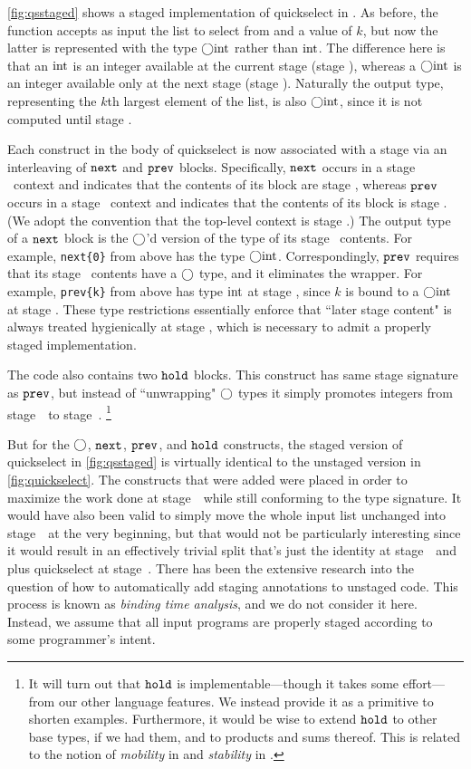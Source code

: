 \ref{fig:qsstaged} shows a staged implementation of quickselect in \lang.
As before, the function accepts as input the list to select from and a value of $k$,
but now the latter is represented with the type $\bigcirc{\rm int}$ rather than ${\rm int}$.
The difference here is that an ${\rm int}$ is an integer available at the current stage (stage \bbone), 
whereas a $\bigcirc{\rm int}$ is an integer available only at the next stage (stage \bbtwo).
Naturally the output type, representing the $k$th largest element of the list,
is also $\bigcirc{\rm int}$, since it is not computed until stage \bbtwo.

Each construct in the body of quickselect is now associated with a stage via an interleaving of ${\tt next}$ and ${\tt prev}$ blocks.  
Specifically, ${\tt next}$ occurs in a stage \bbone\ context and indicates that the contents of its block are stage \bbtwo, 
whereas ${\tt prev}$ occurs in a stage \bbtwo\ context and indicates that the contents of its block is stage \bbone.
(We adopt the convention that the top-level context is stage \bbone.)
The output type of a ${\tt next}$ block is the $\bigcirc$'d version of the type of its stage \bbtwo\ contents.  
For example, \verb|next{0}| from above has the type $\bigcirc{\rm int}$.
Correspondingly, ${\tt prev}$ requires that its stage \bbone\ contents have a $\bigcirc$ type, and it eliminates the wrapper.
For example, \verb|prev{k}| from above has type ${\rm int}$ at stage \bbtwo, since $k$ is bound to a $\bigcirc{\rm int}$ at stage \bbone.
These type restrictions essentially enforce that ``later stage content" is always treated hygienically at stage \bbone,
which is necessary to admit a properly staged implementation.

The code also contains two ${\tt hold}$ blocks.  
This construct has same stage signature as ${\tt prev}$,
but instead of ``unwrapping" $\bigcirc$ types it simply promotes integers from stage~\bbone\ to stage~\bbtwo.
\footnote{It will turn out that ${\tt hold}$ is implementable---though it takes some effort---from our other language features.
We instead provide it as a primitive to shorten examples.  
Furthermore, it would be wise to extend ${\tt hold}$ to other base types, if we had them, and to products and sums thereof.
This is related to the notion of {\em mobility} in \cite{murphy05} and {\em stability} in \cite{krishnaswami13}.}

But for the $\bigcirc$, ${\tt next}$, ${\tt prev}$, and ${\tt hold}$ constructs, 
the staged version of quickselect in \ref{fig:qsstaged} is virtually identical to the unstaged version in \ref{fig:quickselect}.
The constructs that were added were placed in order to maximize the work done at stage~\bbone\ while still conforming to the type signature.
It would have also been valid to simply move the whole input list unchanged into stage~\bbtwo\ at the very beginning, 
but that would not be particularly interesting since it would result in an effectively trivial split 
that's just the identity at stage~\bbone\ and plus quickselect at stage~\bbtwo.
There has been the extensive research into the question of how to automatically add staging annotations to unstaged code.
This process is known as {\em binding time analysis}, and we do not consider it here.
Instead, we assume that all input programs are properly staged according to some programmer's intent.
